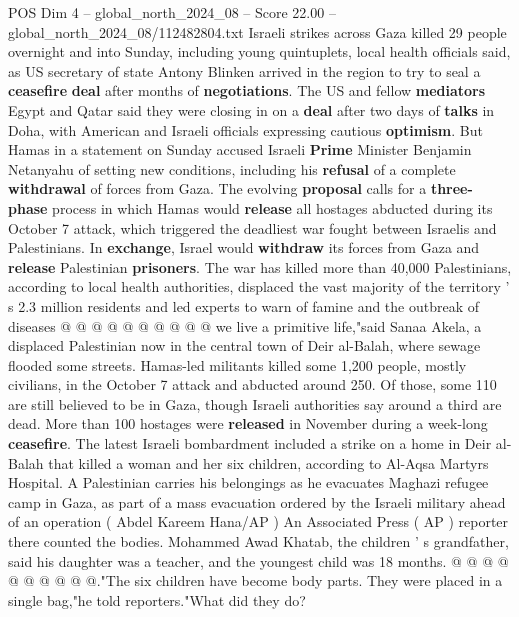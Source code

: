 \begin{textsample}{POS Dim 4 – global\_north\_2024\_08 – Score 22.00 – global\_north\_2024\_08/112482804.txt}  \label{ex:f4_pos_170}
Israeli strikes across Gaza killed 29 people overnight and into Sunday, including young quintuplets, local health officials said, as US secretary of state Antony Blinken arrived in the region to try to seal a \textbf{ceasefire} \textbf{deal} after months of \textbf{negotiations}.
The US and fellow \textbf{mediators} Egypt and Qatar said they were closing in on a \textbf{deal} after two days of \textbf{talks} in Doha, with American and Israeli officials expressing cautious \textbf{optimism}.
But Hamas in a statement on Sunday accused Israeli \textbf{Prime} Minister Benjamin Netanyahu of setting new conditions, including his \textbf{refusal} of a complete \textbf{withdrawal} of forces from Gaza.
The evolving \textbf{proposal} calls for a \textbf{three-phase} process in which Hamas would \textbf{release} all hostages abducted during its October 7 attack, which triggered the deadliest war fought between Israelis and Palestinians.
In \textbf{exchange}, Israel would \textbf{withdraw} its forces from Gaza and \textbf{release} Palestinian \textbf{prisoners}.
The war has killed more than 40,000 Palestinians, according to local health authorities, displaced the vast majority of the territory ' s 2.3 million residents and led experts to warn of famine and the outbreak of diseases @ @ @ @ @ @ @ @ @ @ we live a primitive life,"said Sanaa Akela, a displaced Palestinian now in the central town of Deir al-Balah, where sewage flooded some streets.
Hamas-led militants killed some 1,200 people, mostly civilians, in the October 7 attack and abducted around 250.
Of those, some 110 are still believed to be in Gaza, though Israeli authorities say around a third are dead.
More than 100 hostages were \textbf{released} in November during a week-long \textbf{ceasefire}.
The latest Israeli bombardment included a strike on a home in Deir al-Balah that killed a woman and her six children, according to Al-Aqsa Martyrs Hospital.
A Palestinian carries his belongings as he evacuates Maghazi refugee camp in Gaza, as part of a mass evacuation ordered by the Israeli military ahead of an operation ( Abdel Kareem Hana/AP ) An Associated Press ( AP ) reporter there counted the bodies.
Mohammed Awad Khatab, the children ' s grandfather, said his daughter was a teacher, and the youngest child was 18 months. @ @ @ @ @ @ @ @ @ @."The six children have become body parts.
They were placed in a single bag,"he told reporters."What did they do?

\end{textsample}
